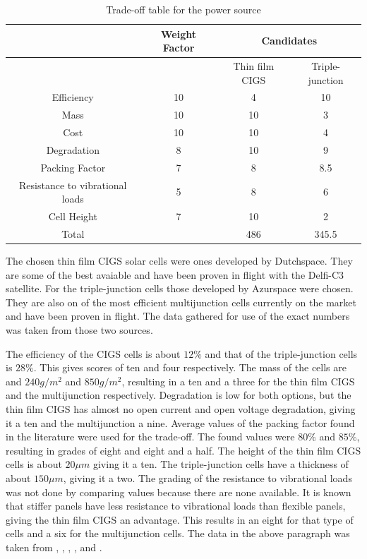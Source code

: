 \begin{table}
\begin{tabular}{|c||c|c|c|}
\hline
 & Weight Factor & \multicolumn{2}{|c|}{Candidates} \\ \hline
 & & Thin film CIGS & Triple-junction \\ \hline
  \hline
 Efficiency & 10 & 4 & 10 \\ \hline
 Mass & 10 & 10 & 3 \\ \hline
 Cost & 10 & 10 & 4 \\ \hline
 Degradation & 8 & 10 & 9 \\ \hline
 Packing Factor & 7 & 8 & 8.5 \\ \hline
 Resistance to vibrational loads & 5 & 8 & 6 \\ \hline
 Cell Height & 7 & 10 & 2 \\ \hline
 \hline
 Total & & 486 & 345.5 \\ \hline
 \end{tabular}
 \caption{Trade-off table for the power source}
 \label{tab:TO_summary}
 \end{table}
 
The chosen thin film CIGS solar cells were ones developed by Dutchspace. They are some of the best avaiable and have been proven in flight with the Delfi-C3 satellite. For the triple-junction cells those developed by Azurspace were chosen. They are also on of the most efficient multijunction cells currently on the market and have been proven in flight. The data gathered for use of the exact numbers was taken from those two sources.

The efficiency of the CIGS cells is about $12\%$ and that of the triple-junction cells is $28\%$. This gives scores of ten and four respectively.
The mass of the cells are and $240g/m^2$ and $850g/m^2$, resulting in a ten and a three for the thin film CIGS and the multijunction respectively.
Degradation is low for both options, but the thin film CIGS has almost no open current and open voltage degradation, giving it a ten and the multijunction a nine. Average values of the packing factor found in the literature were used for the trade-off. The found values were $80\%$ and $85\%$, resulting in grades of eight and eight and a half. The height of the thin film CIGS cells is about $20\mu m$ giving it a ten. The triple-junction cells have a thickness of about $150\mu m$, giving it a two.
The grading of the resistance to vibrational loads was not done by comparing values because there are none available. It is known that stiffer panels have less resistance to vibrational loads than flexible panels, giving the thin film CIGS an advantage. This results in an eight for that type of cells and a six for the multijunction cells.
The data in the above paragraph was taken from \cite{esa_telecomm}, \cite{delfi_c3}, \cite{dutchspace}, \cite{spectrolab}, \cite{cubesatshop} and \cite{azurspace}.


